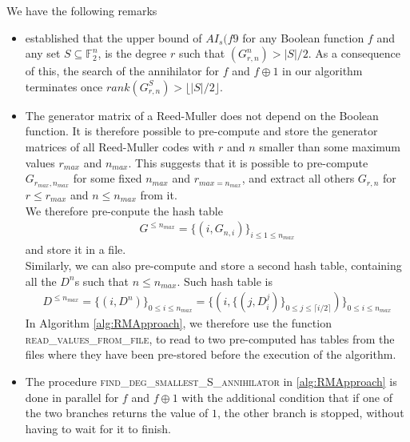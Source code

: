 \documentclass[11pt]{llncs}
\begin{document}
\begin{remark}
	We have the following remarks
	\begin{itemize}
		\item \cite{TOSC:CarMeaRot17} established that the upper bound of $AI_s(f9$ for any Boolean function $f$ and any set $S\subseteq \mathbb{F}_2^n$, is the degree $r$ such that $\left(G_{r,n}^n\right) > |S| / 2$. As a consequence of this, the search of the annihilator for $f$ and $f\oplus 1$ in our algorithm terminates once $rank\left(G_{r,n}^S\right) > \lfloor{|S| / 2}\rfloor$.
		\item The generator matrix of a Reed-Muller does not depend on the Boolean function. It is therefore possible to pre-compute and store the generator matrices of all Reed-Muller codes with $r$ and $n$ smaller than some maximum values $r_{max}$ and $n_{max}$.
		This suggests that it is possible to pre-compute $G_{r_{max}, n_{max}}$ for some fixed $n_{max}$ and $r_{max = n_{max}}$, and extract all others $G_{r,n}$ for $r \leq r_{max}$ and $n \leq n_{max}$ from it.\\
		We therefore pre-conpute the hash table
		\begin{align*}
		G^{\leq n_{max}} = \{\left(i, G_{n,i}\right)\}_{i \leq 1 \leq n_{max}}
		\end{align*}
		and store it in a file.\\
		Similarly, we can also pre-compute and store a second hash table, containing all the $D^n$s such that $n \leq n_{max}$. Such hash table is
		\begin{align*}\label{eq:degreesHashTable}
		D^{\leq n_{max}} =  \{\left(i,D^{n} \right)\}_{0 \leq i \leq n_{max}} =  \{\left(i, \{ \left(j, D_i^j\right)\}_{0\leq j \leq \lceil{i/2}\rceil} \right)\}_{0 \leq i \leq n_{max}}
		\end{align*}
		In Algorithm \ref{alg:RMApproach}, we therefore use the function \textsc{read\_values\_from\_file}, to read to two pre-computed has tables from the files where they have been pre-stored before the execution of the algorithm.
		\item The procedure \textsc{find\_deg\_smallest\_S\_annihilator} in \ref{alg:RMApproach} is done in parallel for $f$ and $f\oplus 1$ with the additional condition that if one of the two branches returns the value of $1$, the other branch is stopped, without having to wait for it to finish.
	\end{itemize}	
\end{remark}
\end{document}

